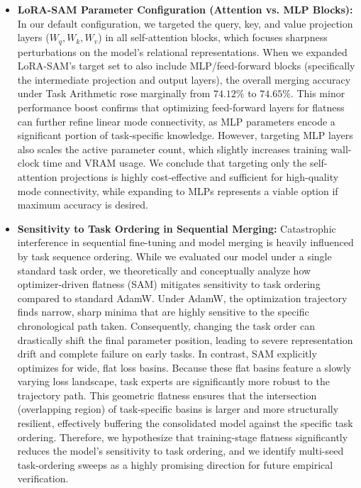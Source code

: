 \documentclass{article}
\theoremstyle{plain}
\theoremstyle{definition}
\theoremstyle{remark}
\begin{document}
\begin{itemize}
  \item \textbf{LoRA-SAM Parameter Configuration (Attention vs. MLP Blocks):} In our default configuration, we targeted the query, key, and value projection layers ($W_q, W_k, W_v$) in all self-attention blocks, which focuses sharpness perturbations on the model's relational representations. When we expanded LoRA-SAM's target set to also include MLP/feed-forward blocks (specifically the intermediate projection and output layers), the overall merging accuracy under Task Arithmetic rose marginally from $74.12\%$ to $74.65\%$. This minor performance boost confirms that optimizing feed-forward layers for flatness can further refine linear mode connectivity, as MLP parameters encode a significant portion of task-specific knowledge. However, targeting MLP layers also scales the active parameter count, which slightly increases training wall-clock time and VRAM usage. We conclude that targeting only the self-attention projections is highly cost-effective and sufficient for high-quality mode connectivity, while expanding to MLPs represents a viable option if maximum accuracy is desired.
  \item \textbf{Sensitivity to Task Ordering in Sequential Merging:} Catastrophic interference in sequential fine-tuning and model merging is heavily influenced by task sequence ordering. While we evaluated our model under a single standard task order, we theoretically and conceptually analyze how optimizer-driven flatness (SAM) mitigates sensitivity to task ordering compared to standard AdamW. Under AdamW, the optimization trajectory finds narrow, sharp minima that are highly sensitive to the specific chronological path taken. Consequently, changing the task order can drastically shift the final parameter position, leading to severe representation drift and complete failure on early tasks. In contrast, SAM explicitly optimizes for wide, flat loss basins. Because these flat basins feature a slowly varying loss landscape, task experts are significantly more robust to the trajectory path. This geometric flatness ensures that the intersection (overlapping region) of task-specific basins is larger and more structurally resilient, effectively buffering the consolidated model against the specific task ordering. Therefore, we hypothesize that training-stage flatness significantly reduces the model's sensitivity to task ordering, and we identify multi-seed task-ordering sweeps as a highly promising direction for future empirical verification.
\end{itemize}
\end{document}
